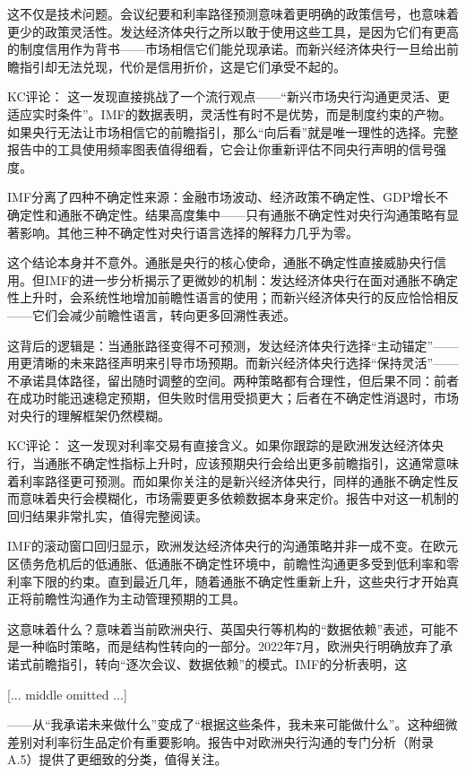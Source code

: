\documentclass[11pt]{ctexart}
\begin{document}
这不仅是技术问题。会议纪要和利率路径预测意味着更明确的政策信号，也意味着更少的政策灵活性。发达经济体央行之所以敢于使用这些工具，是因为它们有更高的制度信用作为背书——市场相信它们能兑现承诺。而新兴经济体央行一旦给出前瞻指引却无法兑现，代价是信用折价，这是它们承受不起的。

KC评论： 这一发现直接挑战了一个流行观点——“新兴市场央行沟通更灵活、更适应实时条件”。IMF的数据表明，灵活性有时不是优势，而是制度约束的产物。如果央行无法让市场相信它的前瞻指引，那么“向后看”就是唯一理性的选择。完整报告中的工具使用频率图表值得细看，它会让你重新评估不同央行声明的信号强度。

IMF分离了四种不确定性来源：金融市场波动、经济政策不确定性、GDP增长不确定性和通胀不确定性。结果高度集中——只有通胀不确定性对央行沟通策略有显著影响。其他三种不确定性对央行语言选择的解释力几乎为零。

这个结论本身并不意外。通胀是央行的核心使命，通胀不确定性直接威胁央行信用。但IMF的进一步分析揭示了更微妙的机制：发达经济体央行在面对通胀不确定性上升时，会系统性地增加前瞻性语言的使用；而新兴经济体央行的反应恰恰相反——它们会减少前瞻性语言，转向更多回溯性表述。

这背后的逻辑是：当通胀路径变得不可预测，发达经济体央行选择“主动锚定”——用更清晰的未来路径声明来引导市场预期。而新兴经济体央行选择“保持灵活”——不承诺具体路径，留出随时调整的空间。两种策略都有合理性，但后果不同：前者在成功时能迅速稳定预期，但失败时信用受损更大；后者在不确定性消退时，市场对央行的理解框架仍然模糊。

KC评论： 这一发现对利率交易有直接含义。如果你跟踪的是欧洲发达经济体央行，当通胀不确定性指标上升时，应该预期央行会给出更多前瞻指引，这通常意味着利率路径更可预测。而如果你关注的是新兴经济体央行，同样的通胀不确定性反而意味着央行会模糊化，市场需要更多依赖数据本身来定价。报告中对这一机制的回归结果非常扎实，值得完整阅读。

IMF的滚动窗口回归显示，欧洲发达经济体央行的沟通策略并非一成不变。在欧元区债务危机后的低通胀、低通胀不确定性环境中，前瞻性沟通更多受到低利率和零利率下限的约束。直到最近几年，随着通胀不确定性重新上升，这些央行才开始真正将前瞻性沟通作为主动管理预期的工具。

这意味着什么？意味着当前欧洲央行、英国央行等机构的“数据依赖”表述，可能不是一种临时策略，而是结构性转向的一部分。2022年7月，欧洲央行明确放弃了承诺式前瞻指引，转向“逐次会议、数据依赖”的模式。IMF的分析表明，这

[... middle omitted ...]

——从“我承诺未来做什么”变成了“根据这些条件，我未来可能做什么”。这种细微差别对利率衍生品定价有重要影响。报告中对欧洲央行沟通的专门分析（附录A.5）提供了更细致的分类，值得关注。
\end{document}
